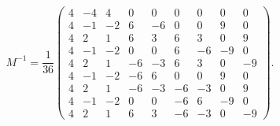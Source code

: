 \documentclass[a4paper,10pt]{scrreprt}
\begin{document}
\begin{equation}
 M^{-1} = \frac{1}{36} \left( \begin{matrix}
       4 & -4 &  4 &  0 &  0 &  0 &  0 &  0 &  0 \\
       4 & -1 & -2 &  6 & -6 &  0 &  0 &  9 &  0 \\
       4 &  2 &  1 &  6 &  3 &  6 &  3 &  0 &  9 \\
       4 & -1 & -2 &  0 &  0 &  6 & -6 & -9 &  0 \\
       4 &  2 &  1 & -6 & -3 &  6 &  3 &  0 & -9 \\
       4 & -1 & -2 & -6 &  6 &  0 &  0 &  9 &  0 \\
       4 &  2 &  1 & -6 & -3 & -6 & -3 &  0 &  9 \\
       4 & -1 & -2 &  0 &  0 & -6 &  6 & -9 &  0 \\
       4 &  2 &  1 &  6 &  3 & -6 & -3 &  0 & -9
\end{matrix} \right).
\end{equation}
\end{document}
